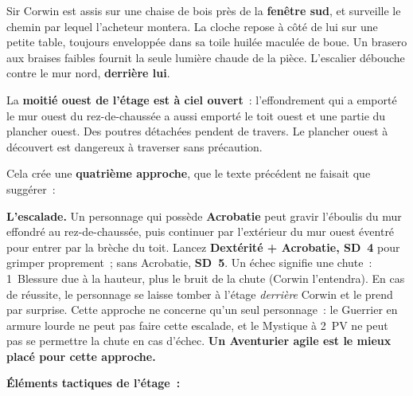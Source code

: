 \documentclass[10pt,a4paper]{article}
\begin{document}
Sir Corwin est assis sur une chaise de bois près de la \textbf{fenêtre sud}, et surveille le chemin par lequel l’acheteur montera. La cloche repose à côté de lui sur une petite table, toujours enveloppée dans sa toile huilée maculée de boue. Un brasero aux braises faibles fournit la seule lumière chaude de la pièce. L’escalier débouche contre le mur nord, \textbf{derrière lui}.

La \textbf{moitié ouest de l’étage est à ciel ouvert}~: l’effondrement qui a emporté le mur ouest du rez-de-chaussée a aussi emporté le toit ouest et une partie du plancher ouest. Des poutres détachées pendent de travers. Le plancher ouest à découvert est dangereux à traverser sans précaution.

Cela crée une \textbf{quatrième approche}, que le texte précédent ne faisait que suggérer~:

\textbf{L’escalade.} Un personnage qui possède \textbf{Acrobatie} peut gravir l’éboulis du mur effondré au rez-de-chaussée, puis continuer par l’extérieur du mur ouest éventré pour entrer par la brèche du toit. Lancez \textbf{Dextérité + Acrobatie, SD~4} pour grimper proprement~; sans Acrobatie, \textbf{SD~5}. Un échec signifie une chute~: 1~Blessure due à la hauteur, plus le bruit de la chute (Corwin l’entendra). En cas de réussite, le personnage se laisse tomber à l’étage \emph{derrière} Corwin et le prend par surprise. Cette approche ne concerne qu’un seul personnage~: le Guerrier en armure lourde ne peut pas faire cette escalade, et le Mystique à 2~PV ne peut pas se permettre la chute en cas d’échec. \textbf{Un Aventurier agile est le mieux placé pour cette approche.}

\par{}\noindent\textbf{Éléments tactiques de l’étage~:}
\end{document}
